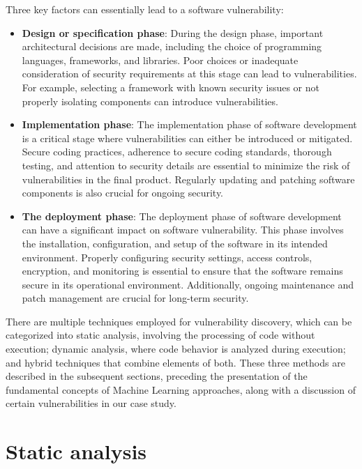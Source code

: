 Three key factors can essentially lead to a software vulnerability:
\begin{itemize}
\item  \textbf{Design or specification phase}: During the design phase, important architectural decisions are made, including the choice of programming languages, frameworks, and libraries. Poor choices or inadequate consideration of security requirements at this stage can lead to vulnerabilities. For example, selecting a framework with known security issues or not properly isolating components can introduce vulnerabilities.

\item \textbf{Implementation phase}: The implementation phase of software development is a critical stage where vulnerabilities can either be introduced or mitigated. Secure coding practices, adherence to secure coding standards, thorough testing, and attention to security details are essential to minimize the risk of vulnerabilities in the final product. Regularly updating and patching software components is also crucial for ongoing security.

\item \textbf{The deployment phase}: The deployment phase of software development can have a significant impact on software vulnerability. This phase involves the installation, configuration, and setup of the software in its intended environment. Properly configuring security settings, access controls, encryption, and monitoring is essential to ensure that the software remains secure in its operational environment. Additionally, ongoing maintenance and patch management are crucial for long-term security.

\end{itemize}

There are multiple techniques employed for vulnerability discovery, which can be categorized into static analysis, involving the processing of code without execution; dynamic analysis, where code behavior is analyzed during execution; and hybrid techniques that combine elements of both. These three methods are described in the subsequent sections, preceding the presentation of the fundamental concepts of Machine Learning approaches, along with a discussion of certain vulnerabilities in our case study.




\section{Static analysis} %
\label{sec:	Static_analysis}

